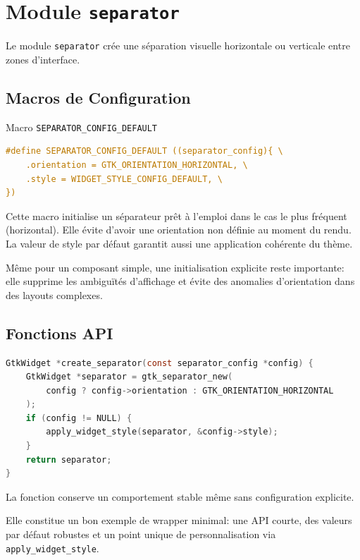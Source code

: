 \section{Module \texttt{separator}}

Le module \texttt{separator} crée une séparation visuelle horizontale ou verticale entre zones d'interface.

\subsection{Macros de Configuration}

\begin{docbox}{Macro \texttt{SEPARATOR\_CONFIG\_DEFAULT}}
\begin{lstlisting}[language=C]
#define SEPARATOR_CONFIG_DEFAULT ((separator_config){ \
    .orientation = GTK_ORIENTATION_HORIZONTAL, \
    .style = WIDGET_STYLE_CONFIG_DEFAULT, \
})
\end{lstlisting}
\end{docbox}

Cette macro initialise un séparateur prêt à l'emploi dans le cas le plus fréquent (horizontal). Elle évite d'avoir une orientation non définie au moment du rendu. La valeur de style par défaut garantit aussi une application cohérente du thème.

Même pour un composant simple, une initialisation explicite reste importante: elle supprime les ambiguïtés d'affichage et évite des anomalies d'orientation dans des layouts complexes.

\subsection{Fonctions API}

\begin{lstlisting}[language=C]
GtkWidget *create_separator(const separator_config *config) {
    GtkWidget *separator = gtk_separator_new(
        config ? config->orientation : GTK_ORIENTATION_HORIZONTAL
    );
    if (config != NULL) {
        apply_widget_style(separator, &config->style);
    }
    return separator;
}
\end{lstlisting}

La fonction conserve un comportement stable même sans configuration explicite.

Elle constitue un bon exemple de wrapper minimal: une API courte, des valeurs par défaut robustes et un point unique de personnalisation via \texttt{apply\_widget\_style}.

\newpage
